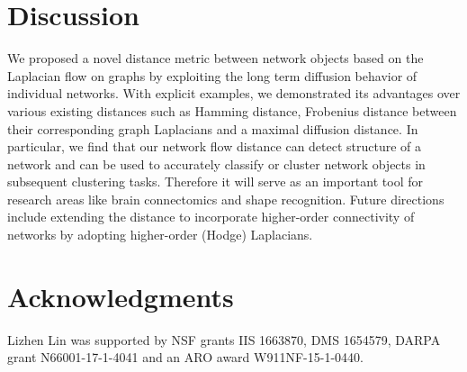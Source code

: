 \documentclass{amsart}
\begin{document}
\section{Discussion}
We proposed a novel distance metric between network objects based on the Laplacian flow on graphs by exploiting the long term diffusion behavior of individual networks. With explicit examples, we demonstrated its advantages over various existing distances such as Hamming distance, Frobenius distance between their corresponding graph Laplacians and a maximal diffusion distance. In particular, we find that our network flow distance can detect structure of a network and can be used to accurately classify  or cluster network objects in subsequent clustering tasks.
Therefore it will serve as an important tool for research areas like brain connectomics and shape recognition. Future directions include extending the distance to incorporate  higher-order connectivity of networks by adopting higher-order (Hodge) Laplacians. 

	\section*{Acknowledgments}
	Lizhen Lin was  supported by NSF grants IIS  1663870, DMS 1654579,  DARPA grant N66001-17-1-4041 and an ARO award W911NF-15-1-0440.
	
\end{document}
